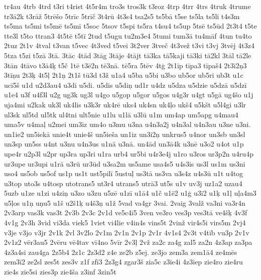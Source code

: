 {{tr4au 4trb 4trd t3ri t4rist 4t5r4m tro3s tros3k t3roz 4trp 4trr 4trs
4truk 4trume tr3\={a}2k t3r\={a}\v{z} 5tr\={e}\v{s}o 5tr\={i}c
5tr\={i}\v{c} 3t4r\={u} 4t3s4 tsa2s5 ts5b\={a} t5se ts5la
ts5li t4s3m ts5ma ts5mi ts5m\={e} ts5m\={i} t5soc 5tsov t5spi ts5ra
t4su4 ts5up 5ts\={e} ts5\={u}d 2t3t4 t5te tte3l t5to ttran3 4t5t\={e}
t5t\={i} 2tud t5ugu tu2m3e4 5tumi tum3\={a} tu4m\={a}f 4tun
tu4to 2tuz 2t1v 4tval t3van t5vec 4t3ved t5vei 3t2ver 3tve\v{c} 4t3ve\v{z}
t3vi t3vj 3tv\={e}j 4t3z4 5tza t5zi t5z\={a} 3t\={a}. 3t\={a}c
4t\={a}d 3t\={a}g 3t\={a}je 4t\={a}jt t\={a}3ka t\={a}5kaji
t\={a}3ki t\={a}2kl 3t\={a}l t\={a}2le 3t\={a}n 4t\={a}vo
t3\={a}4\c{k} t5\v{c} 1t\={e} t3\={e}2n t\={e}3n\={a}. t\={e}5ra
5t\={e}v 4t\c{g} 2t1\={i}p t\={i}pa3 t\={i}pa\v{s}4 2t3\={i}2\c{n}3
3t\={i}\c{n}u 2t3\c{k} 4t5\c{l} 2t1\c{n} 2t1\v{s}
t\={u}3d t3\v{z} u1a4 u5ba u5bi u3bo ub5or ub5ri ub3t u1c uc\={i}5\v{s}
u1d u2d3au4 u3di u5di. u5dis u5di\c{n} ud1r u4dz u5dza u5dzie
u5dz\={a} u5dz\={i} u1e4 u3f u4f3l u2g ug3k ug3l u4go u5gop u5gor
u5gos u4g3r u4gt u5g\={a} ug4\v{s}o u1j uja4mi u2kak uk3l uk4lis
u3k3r uk4r\={e} uks4 uk4sn uk4\c{l}o uk\v{s}4 u5k\v{s}t u5l4gi
u3lr ul3sk ul5td ul5tk ul4tni ult5nie u1lu u1l\={a} u3l\={u} u1m
um4ap um5apg u4mau4 uma5v u4ma\c{l} u2mei um3iz um4o u3mu u3na u4n3a2j
u4n3al u4n3au u3ne u3ni. un1ie2 un5iek\={a} unie4t unie4\v{s}
un5ie\v{s}a un1iz un3i2\c{n} unkrus5 u4nor un3sb un3sl un3sp
un5ss u4nt u3nu u4n3us u1n\={a} u3n\={a}. un4\={a}d un3\={a}4k
u3n\={e} u3o2 u4ot u1p upe4r u2p3l u2pr up3ra up3ri u1ra urb4
ur5bi u4r3e4j u1ro u3ros ur3p2n u4ru4p ur3upe ur3upi u1r\={a} u3r\={u}
ur3\={u}d u3sa2m us5ame usa4s5 u4s3is us3l us1m us3ni uso4 us5ob
us5of us1p us1t ust5pil\={i} 5ustu\c{l} us3t\={a} us3va u3s4z u4s3\={u}
u1t u4tog u3top uto3s u4tosp utotrans5 ut3r4 utrans5 utr\={a}3
ut5s u1v uv3j uz1a2 uzau4 5uzb u1ze u1zi u4zi\c{n} u3zo u3zu u5z\={e}
u1z\={i} u1\={a}4 u1\v{c} u1\={e}2 u1\c{g} u3\={i}2 u1\c{k}
u1\c{l} u\c{l}a4m3 u5\c{l}os u1\c{n} u\c{n}u5 u1\v{s} u2\v{s}1\c{k}
u4\v{s}3\c{n} u1\v{z} 5vad va4gr 3vai. 2vaig 3val\v{z}
va3ni va3r4n 2v3arp vas3k vas3t 2v3b 2v3c 2v1d ve5c4\={i}5 3ven
ve3ro ves3p ves3t\={a} ve4\v{s}\c{k} 4v3f 4v1g 2v3h 3vid vi3da viek5
1viet vi4lie v4in4s vins5t 2vin\v{z} vir4s5i virs5m 2vj4 v3je v3jo
v3jr 2v1k 2vl 3v2lo 2v1m 2v1n 2v1p 2v1r 4v1s4 2v3t v4t\={i}b vu3p 2v1v
2v1z2 v\={e}r3au5 2v\={e}ru v\={e}4tav v\={i}4no 5v\={i}r 2v3\c{l}
2v\v{z} za2c za4g zal5 za2n 4z3ap za3pa 4z3a4si zau4ga 2z5b4 2z1c
2z3d2 z4e ze2b z5ej. ze3jo zem3a zem1\={a}4 ze4m\={e}s zem3\={i}2
ze2sl zes5t zes3v z1f zf\={i}3 2z3g4 zgar3\v{s} zia5c z3ie4i
4z3iep zie4ro zie4ru zie4s zie5si zies3p zie4\v{s}a z3inf 3zin5t
}}
